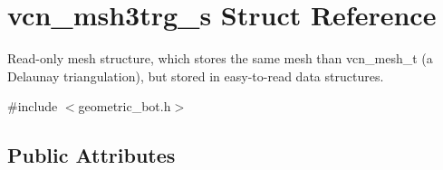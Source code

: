 \hypertarget{structvcn__msh3trg__s}{\section{vcn\+\_\+msh3trg\+\_\+s Struct Reference}
\label{structvcn__msh3trg__s}
}


Read-\/only mesh structure, which stores the same mesh than vcn\+\_\+mesh\+\_\+t (a Delaunay triangulation), but stored in easy-\/to-\/read data structures.  




{\ttfamily \#include $<$geometric\+\_\+bot.\+h$>$}

\subsection*{Public Attributes}
